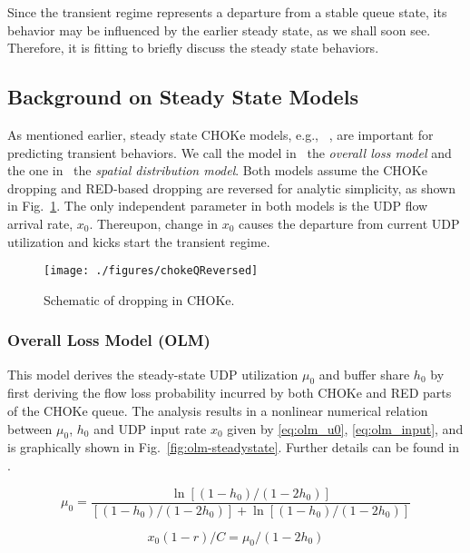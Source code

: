 \documentclass{IEEEtran}
\begin{document}
    Since the transient regime represents a departure from a stable queue state, its behavior may be influenced by the earlier steady state, as we shall soon see. Therefore, it is fitting to briefly discuss the steady state behaviors.

    \subsection{Background on Steady State Models}\label{subsec:backgrnd}
    As mentioned earlier, steady state CHOKe models, e.g., ~\cite{ChokeToN04,ChokeSigmetrics03}, are important for predicting transient behaviors. We call the model in~\cite{ChokeSigmetrics03} the \emph{overall loss model} and the one in~\cite{ChokeToN04} the \emph{spatial distribution model}. Both models assume the CHOKe dropping and RED-based dropping are reversed for analytic simplicity, as shown in Fig.~\ref{fig:chokeQReveresed}. The only independent parameter in both models is the UDP flow arrival rate, $x_0$. Thereupon, change in $x_0$ causes the departure from current UDP utilization and kicks start the transient regime.

        \begin{figure}[tbh!]
            \centering
            \texttt{[image: ./figures/chokeQReversed]}\caption{Schematic of dropping in CHOKe.}
            \label{fig:chokeQReveresed}
    \end{figure}

    \subsubsection{Overall Loss Model (OLM)}\label{subsub:olmModel}
    This model derives the steady-state UDP utilization $\mu_0$ and buffer share $h_0$ by first deriving the flow loss probability incurred by both CHOKe and RED parts of the CHOKe queue. The analysis results in a nonlinear numerical relation between $\mu_0$, $h_0$ and UDP input rate $x_0$  given by \eqref{eq:olm_u0}, \eqref{eq:olm_input}, and is graphically shown in Fig.~\ref{fig:olm-steadystate}. Further details can be found in \cite{ChokeSigmetrics03}.

        \begin{equation}
         \mu_0              = \frac{\ln[(1-h_0)/(1-2h_0) ]}{ [ (1-h_0)/(1-2h_0) ]+ \ln[(1-h_0)/(1-2h_0) ] }   \label{eq:olm_u0}
       \end{equation}

       \begin{equation}
         x_0(1-r)/C = \mu_0/(1-2h_0)     \label{eq:olm_input}
       \end{equation}
\end{document}
